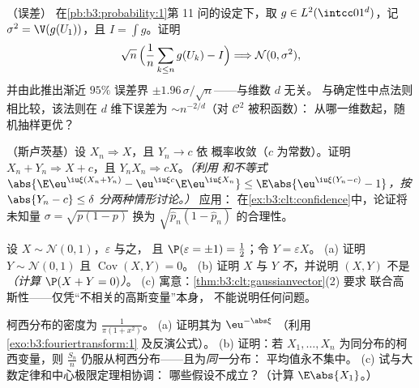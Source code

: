 \begin{exercise}[$\star\star$]\label{exo:b3:clt:7}
（误差）
在\cref{pb:b3:probability:1}第 11 问的设定下，取 $g \in
L^2(\intcc01^d)$，记 $\sigma^2 = \V(g(U_1))$，且 $I = \int
g$。证明
\[
\sqrt n\,\Bigl(\frac1n\sum_{k\leq n}g(U_k) - I\Bigr)
\Longrightarrow \mathcal N(0, \sigma^2),
\]
并由此推出渐近 $95\%$ 误差界 $\pm
1.96\,\sigma/\sqrt n$——与维数 $d$ 无关。
与确定性中点法则相比较，该法则在
$d$ 维下误差为 $\sim n^{-2/d}$（对 $\mathcal C^2$ 被积函数）：
从哪一维数起，随机抽样更优？
\end{exercise}

\begin{exercise}[$\star\star\star$]\label{exo:b3:clt:8}
（斯卢茨基）设 $X_n \Rightarrow X$，且 $Y_n \to c$ 依
概率收敛（$c$ 为常数）。证明 $X_n + Y_n \Rightarrow X +
c$，且 $Y_nX_n \Rightarrow cX$。\emph{（利用
和不等式 $\abs{\E\eu^{\iu\xi
(X_n+Y_n)} - \eu^{\iu\xi c}\E\eu^{\iu\xi X_n}} \leq
\E\abs{\eu^{\iu\xi(Y_n - c)} - 1}$，按 $\abs{Y_n - c}
\leq \delta$ 分两种情形讨论。）} 应用：
在\cref{ex:b3:clt:confidence}中，论证将未知量
$\sigma = \sqrt{p(1-p)}$ 换为 $\sqrt{\hat p_n(1 - \hat
p_n)}$ 的合理性。
\end{exercise}

\begin{exercise}[$\star\star\star$]\label{exo:b3:clt:9}
设 $X \sim \mathcal N(0,1)$，$\varepsilon$ 与之，
且 $\P(\varepsilon = \pm1) = \frac12$；令 $Y =
\varepsilon X$。
(a) 证明 $Y \sim \mathcal N(0,1)$ 且
$\operatorname{Cov}(X, Y) = 0$。
(b) 证明 $X$ 与 $Y$ \emph{不}，并说明
$(X, Y)$ 不是 \emph{（计算 $\P(X + Y =
0)$）}。
(c) 寓意：\cref{thm:b3:clt:gaussianvector}(2) 要求
联合高斯性——仅凭“不相关的高斯变量”本身，
不能说明任何问题。
\end{exercise}

\begin{exercise}[$\star\star$]\label{exo:b3:clt:10}
柯西分布的密度为 $\frac1{\pi(1 + x^2)}$。
(a) 证明其为 $\eu^{-\abs\xi}$
（利用\cref{exo:b3:fouriertransform:1} 及反演公式）。
(b) 证明：若 $X_1, \dots, X_n$ 为同分布的柯西变量，则
$\frac{S_n}n$ 仍服从柯西分布——且为\emph{同一}分布：
平均值永不集中。
(c) 试与大数定律和中心极限定理相协调：
哪些假设不成立？（计算 $\E\abs{X_1}$。）
\end{exercise}


